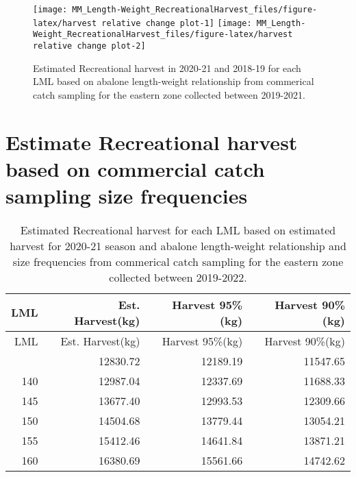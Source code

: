 \documentclass[
  11pt,
]{article}
\begin{document}
\begin{figure}

{\centering \texttt{[image: MM\_Length-Weight\_RecreationalHarvest\_files/figure-latex/harvest relative change plot-1]} \texttt{[image: MM\_Length-Weight\_RecreationalHarvest\_files/figure-latex/harvest relative change plot-2]} 

}

\caption{Estimated Recreational harvest in 2020-21 and 2018-19 for each LML based on abalone length-weight relationship from commerical catch sampling for the eastern zone collected between 2019-2021.}\label{fig:harvest relative change plot}
\end{figure}

\section{Estimate Recreational harvest based on commercial catch
sampling size
frequencies}\label{estimate-recreational-harvest-based-on-commercial-catch-sampling-size-frequencies}

\begin{longtable}[]{@{}rrrr@{}}
\caption{Estimated Recreational harvest for each LML based on estimated
harvest for 2020-21 season and abalone length-weight relationship and
size frequencies from commerical catch sampling for the eastern zone
collected between 2019-2022.}\tabularnewline
\toprule\noalign{}
LML & Est. Harvest(kg) & Harvest 95\%(kg) & Harvest 90\%(kg) \\
\midrule\noalign{}
\endfirsthead
\toprule\noalign{}
LML & Est. Harvest(kg) & Harvest 95\%(kg) & Harvest 90\%(kg) \\
\midrule\noalign{}
\endhead
\bottomrule\noalign{}
\endlastfoot
138 & 12830.72 & 12189.19 & 11547.65 \\
140 & 12987.04 & 12337.69 & 11688.33 \\
145 & 13677.40 & 12993.53 & 12309.66 \\
150 & 14504.68 & 13779.44 & 13054.21 \\
155 & 15412.46 & 14641.84 & 13871.21 \\
160 & 16380.69 & 15561.66 & 14742.62 \\
\end{longtable}
\end{document}
